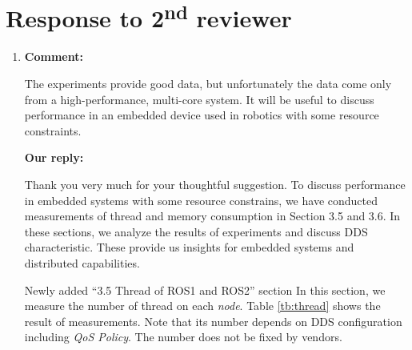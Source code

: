 \documentclass{article}
\newcommand\nd{\textsuperscript{nd}\xspace}
\begin{document}
\newpage

\section{Response to 2\nd reviewer}
\begin{enumerate}

\item \begin{flushleft}
  \textbf{Comment:}
\end{flushleft}
  The experiments provide good data, but unfortunately the data come only from a high-performance, multi-core system. 
  It will be useful to discuss performance in an embedded device used in robotics with some resource constraints.

  \begin{flushleft}
    \textbf{Our reply:}
  \end{flushleft}
  Thank you very much for your thoughtful suggestion.
  To discuss performance in embedded systems with some resource constrains, we have conducted measurements of thread and memory consumption in Section 3.5 and 3.6.
  In these sections, we analyze the results of experiments and discuss DDS characteristic.
  These provide us insights for embedded systems and distributed capabilities.
  \begin{itembox}[|]{Newly added ``3.5 Thread of ROS1 and ROS2'' section}
    In this section, we measure the number of thread on each \emph{node}.
    Table \ref{tb:thread} shows the result of measurements.
    Note that its number depends on DDS configuration including \emph{QoS Policy}.
    The number does not be fixed by vendors.


\end{itembox}
\end{enumerate}
\end{document}

